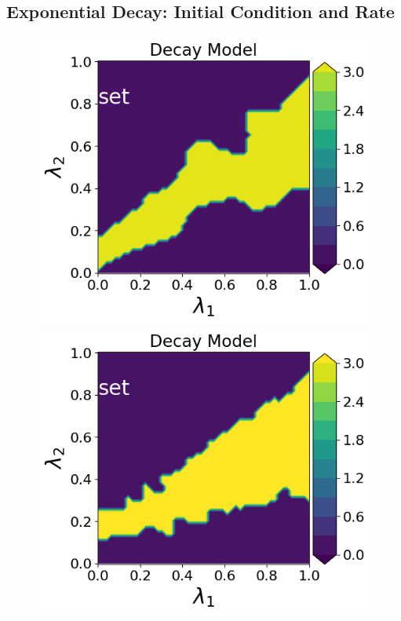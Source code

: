 \subsection{Exponential Decay: Initial Condition and Rate}\label{ex:decay-set-sample-accuracy}

\begin{figure}[h]
\begin{minipage}{.4\textwidth}
\includegraphics[width=\linewidth]{examples/fig_decay_q1/DecayModel--set_N50_em.png}
\includegraphics[width=\linewidth]{examples/fig_decay_q1/DecayModel--set_N500_em.png}


\end{minipage}
\end{figure}
